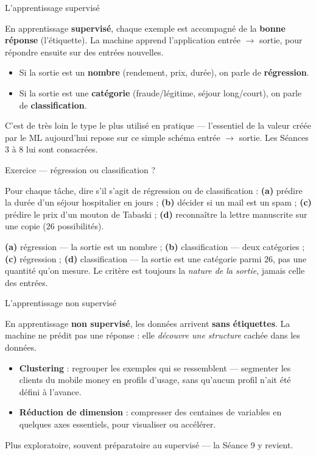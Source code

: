 \documentclass[aspectratio=169,11pt]{beamer}
\begin{document}
\begin{frame}{L'apprentissage supervisé}
\begin{ucaddef}[Définition]
{\small En apprentissage \textbf{supervisé}, chaque exemple est accompagné de la \textbf{bonne réponse} (l'étiquette). La machine apprend l'application entrée $\to$ sortie, pour répondre ensuite sur des entrées nouvelles.}
\end{ucaddef}
\begin{itemize}\small
  \item Si la sortie est un \textbf{nombre} (rendement, prix, durée), on parle de \textbf{régression}.
  \item Si la sortie est une \textbf{catégorie} (fraude/légitime, séjour long/court), on parle de \textbf{classification}.
\end{itemize}
{\small C'est de très loin le type le plus utilisé en pratique — l'essentiel de la valeur créée par le ML aujourd'hui repose sur ce simple schéma entrée $\to$ sortie. Les Séances 3 à 8 lui sont consacrées.}
\end{frame}

\begin{frame}{Exercice — régression ou classification ?}
\begin{ucadrec}[Énoncé]
{\small Pour chaque tâche, dire s'il s'agit de régression ou de classification : \textbf{(a)} prédire la durée d'un séjour hospitalier en jours ; \textbf{(b)} décider si un mail est un spam ; \textbf{(c)} prédire le prix d'un mouton de Tabaski ; \textbf{(d)} reconnaître la lettre manuscrite sur une copie ($26$ possibilités).}
\end{ucadrec}
\pause
\begin{ucadex}[Correction]
{\small \textbf{(a)} régression — la sortie est un nombre ; \textbf{(b)} classification — deux catégories ; \textbf{(c)} régression ; \textbf{(d)} classification — la sortie est une catégorie parmi $26$, pas une quantité qu'on mesure. Le critère est toujours la \emph{nature de la sortie}, jamais celle des entrées.}
\end{ucadex}
\end{frame}

\begin{frame}{L'apprentissage non supervisé}
\begin{ucaddef}[Définition]
{\small En apprentissage \textbf{non supervisé}, les données arrivent \textbf{sans étiquettes}. La machine ne prédit pas une réponse : elle \emph{découvre une structure} cachée dans les données.}
\end{ucaddef}
\begin{itemize}\small
  \item \textbf{Clustering} : regrouper les exemples qui se ressemblent — segmenter les clients du mobile money en profils d'usage, sans qu'aucun profil n'ait été défini à l'avance.
  \item \textbf{Réduction de dimension} : compresser des centaines de variables en quelques axes essentiels, pour visualiser ou accélérer.
\end{itemize}
{\small Plus exploratoire, souvent préparatoire au supervisé — la Séance 9 y revient.}
\end{frame}
\end{document}
